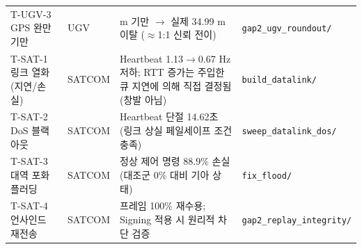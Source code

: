 \begin{table}[H]
\begin{tabularx}{\textwidth}{@{} l l >{\raggedright\arraybackslash}X >{\raggedright\arraybackslash}X @{}}
T-UGV-3 GPS 완만 기만 & UGV & 35 m 기만 $\to$ 실제 34.99 m 이탈 ($\approx$1:1 신뢰 전이) & \texttt{gap2\_ugv\_roundout/} \\
T-SAT-1 링크 열화 (지연/손실) & SATCOM & Heartbeat 1.13$\to$0.67 Hz 저하; RTT 증가는 주입한 큐 지연에 의해 직접 결정됨(창발 아님) & \texttt{build\_datalink/} \\
T-SAT-2 DoS 블랙아웃 & SATCOM & Heartbeat 단절 14.62초 (링크 상실 페일세이프 조건 충족) & \texttt{sweep\_datalink\_dos/} \\
T-SAT-3 대역 포화 플러딩 & SATCOM & 정상 제어 명령 88.9\% 손실 (대조군 0\% 대비 기아 상태) & \texttt{fix\_flood/} \\
T-SAT-4 언사인드 재전송 & SATCOM & 프레임 100\% 재수용; Signing 적용 시 원리적 차단 검증 & \texttt{gap2\_replay\_integrity/} \\
\bottomrule
\end{tabularx}
\end{table}

